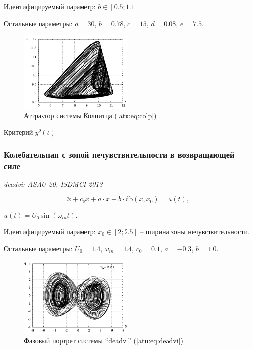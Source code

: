\documentclass[a4paper,12pt]{article}
\newcommand{\LinkRef}[1]{ \textit{#1} }
\begin{document}
Идентифицируемый параметр:
$b \in [ 0.5; 1.1 ]$

Остальные параметры:
$ a = 30$, $b = 0.78$, $c=15$, $d=0.08$, $e=7.5$.

\begin{figure}[htb!]
\centerline{\includegraphics[width=0.5\textwidth]{p/cha/colp_phase.pdf} }
\caption{Аттрактор системы Колпитца (\ref{atu:eq:colp})}
\label{atu:f:colp_phase}
\end{figure}


Критерий
$\overline{y^2}(t)$



\FloatBarrier

\subsubsection{Колебательная с зоной нечувствительности в возвращающей силе} %

\LinkRef{
  deadvi: ASAU-20, ISDMCI-2013
}

\begin{equation}
\ddot{x} + c_0 \dot{x} + a \cdot x + b \cdot \mathrm{db}(x,x_0) = u(t),
\label{atu:eq:deadvi}
\end{equation}

$ u(t) = U_0 \sin( \omega_{in} t ) $.

Идентифицируемый параметр:
$ x_0 \in [2;2.5] $ -- ширина зоны нечувствительности.

Остальные параметры:
$U_0 = 1.4$, $\omega_{in} = 1.4$, $c_0=0.1$, $a=-0.3$, $b=1.0$.


\begin{figure}[htb!]
\centerline{\includegraphics[width=0.5\textwidth]{p/cha/deadvi_phase.pdf} }
\caption{Фазовый портрет системы ``deadvi'' (\ref{atu:eq:deadvi})}
\label{atu:f:deadvi_phase}
\end{figure}
\end{document}
